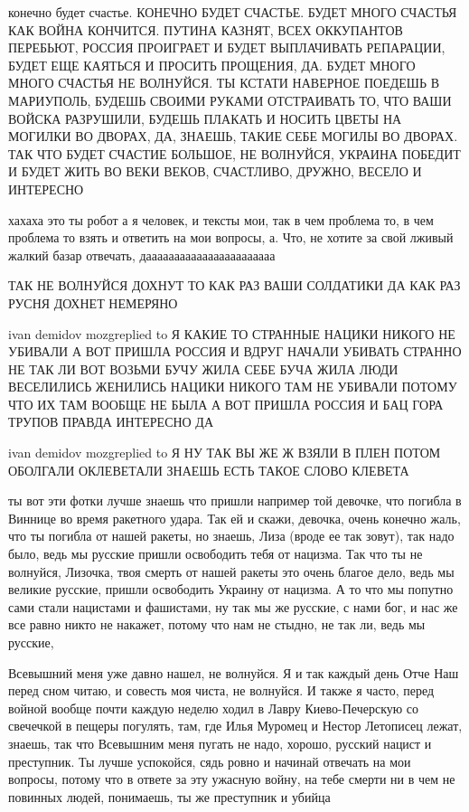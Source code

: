 конечно будет счастье. КОНЕЧНО БУДЕТ СЧАСТЬЕ. БУДЕТ МНОГО СЧАСТЬЯ КАК ВОЙНА
КОНЧИТСЯ. ПУТИНА КАЗНЯТ, ВСЕХ ОККУПАНТОВ ПЕРЕБЬЮТ, РОССИЯ ПРОИГРАЕТ И БУДЕТ
ВЫПЛАЧИВАТЬ РЕПАРАЦИИ, БУДЕТ ЕЩЕ КАЯТЬСЯ И ПРОСИТЬ ПРОЩЕНИЯ, ДА. БУДЕТ МНОГО
МНОГО СЧАСТЬЯ НЕ ВОЛНУЙСЯ. ТЫ КСТАТИ НАВЕРНОЕ ПОЕДЕШЬ В МАРИУПОЛЬ, БУДЕШЬ
СВОИМИ РУКАМИ ОТСТРАИВАТЬ ТО, ЧТО ВАШИ ВОЙСКА РАЗРУШИЛИ, БУДЕШЬ ПЛАКАТЬ И
НОСИТЬ ЦВЕТЫ НА МОГИЛКИ ВО ДВОРАХ, ДА, ЗНАЕШЬ, ТАКИЕ СЕБЕ МОГИЛЫ ВО ДВОРАХ. ТАК
ЧТО БУДЕТ СЧАСТИЕ БОЛЬШОЕ, НЕ ВОЛНУЙСЯ, УКРАИНА ПОБЕДИТ И БУДЕТ ЖИТЬ ВО ВЕКИ
ВЕКОВ, СЧАСТЛИВО, ДРУЖНО, ВЕСЕЛО И ИНТЕРЕСНО

хахаха это ты робот а я человек, и тексты мои, так в чем проблема то, в чем
проблема то взять и ответить на мои вопросы, а. Что, не хотите за свой лживый
жалкий базар отвечать, дааааааааааааааааааааааа

ТАК НЕ ВОЛНУЙСЯ ДОХНУТ ТО КАК РАЗ ВАШИ СОЛДАТИКИ ДА КАК РАЗ РУСНЯ ДОХНЕТ
НЕМЕРЯНО

ivan demidov mozgreplied to Я КАКИЕ ТО СТРАННЫЕ НАЦИКИ НИКОГО НЕ УБИВАЛИ А ВОТ
ПРИШЛА РОССИЯ И ВДРУГ НАЧАЛИ УБИВАТЬ СТРАННО НЕ ТАК ЛИ ВОТ ВОЗЬМИ БУЧУ ЖИЛА
СЕБЕ БУЧА ЖИЛА ЛЮДИ ВЕСЕЛИЛИСЬ ЖЕНИЛИСЬ НАЦИКИ НИКОГО ТАМ НЕ УБИВАЛИ ПОТОМУ ЧТО
ИХ ТАМ ВООБЩЕ НЕ БЫЛА А ВОТ ПРИШЛА РОССИЯ И БАЦ ГОРА ТРУПОВ ПРАВДА ИНТЕРЕСНО ДА

ivan demidov mozgreplied to Я НУ ТАК ВЫ ЖЕ Ж ВЗЯЛИ В ПЛЕН ПОТОМ ОБОЛГАЛИ
ОКЛЕВЕТАЛИ ЗНАЕШЬ ЕСТЬ ТАКОЕ СЛОВО КЛЕВЕТА

ты вот эти фотки лучше знаешь что пришли например той девочке, что погибла в
Виннице во время ракетного удара. Так ей и скажи, девочка, очень конечно жаль,
что ты погибла от нашей ракеты, но знаешь, Лиза (вроде ее так зовут), так надо
было, ведь мы русские пришли освободить тебя от нацизма. Так что ты не
волнуйся, Лизочка, твоя смерть от нашей ракеты это очень благое дело, ведь мы
великие русские, пришли освободить Украину от нацизма. А то что мы попутно сами
стали нацистами и фашистами, ну так мы же русские, с нами бог, и нас же все
равно никто не накажет, потому что нам не стыдно, не так ли, ведь мы русские, 

Всевышний меня уже давно нашел, не волнуйся. Я и так каждый день Отче Наш перед
сном читаю, и совесть моя чиста, не волнуйся. И также я часто, перед войной
вообще почти каждую неделю ходил в Лавру Киево-Печерскую со свечечкой в пещеры
погулять, там, где Илья Муромец и Нестор Летописец лежат, знаешь, так что
Всевышним меня пугать не надо, хорошо, русский нацист и преступник. Ты лучше
успокойся, сядь ровно и начинай отвечать на мои вопросы, потому что в ответе за
эту ужасную войну, на тебе смерти ни в чем не повинных людей, понимаешь, ты же
преступник и убийца

